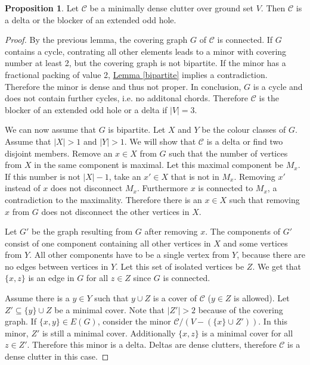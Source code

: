 \documentclass[a4paper, 12pt, twoside=false]{scrbook}
\theoremstyle{definition}
\newtheorem{proposition}[theorem]{Proposition}
\begin{document}
   \begin{proposition}\label{twomember}
       Let $\mathcal{C}$ be a minimally dense clutter over ground set $V$.
       Then $\mathcal{C}$ is a delta or the blocker of an extended odd hole.
   \end{proposition}

   \begin{proof}
       By the previous lemma, the covering graph $G$ of $\mathcal{C}$ is connected.
       If $G$ contains a cycle, contrating all other elements leads to a minor with covering number at least 2, but the covering graph is not bipartite.
       If the minor has a fractional packing of value 2, \hyperref[bipartite]{Lemma \ref*{bipartite}} implies a contradiction. Therefore the minor is dense and thus not proper.
       In conclusion, $G$ is a cycle and does not contain further cycles, i.e. no additonal chords.
       Therefore $\mathcal{C}$ is the blocker of an extended odd hole or a delta if $|V|=3$.

       We can now assume that $G$ is bipartite.
       Let $X$ and $Y$ be the colour classes of $G$.
       Assume that $|X|>1$ and $|Y|>1$.
       We will show that $\mathcal{C}$ is a delta or find two disjoint members.
       Remove an $x \in X$ from $G$ such that the number of vertices from $X$ in the same component is maximal.
       Let this maximal component be $M_x$.
       If this number is not $|X|-1$, take an $x' \in X$ that is not in $M_x$.
       Removing $x'$ instead of $x$ does not disconnect $M_x$. Furthermore $x$ is connected to $M_x$, a contradiction to the maximality.
       Therefore there is an $x \in X$ such that removing $x$ from $G$ does not disconnect the other vertices in $X$.

       Let $G'$ be the graph resulting from $G$ after removing $x$.
       The components of $G'$ consist of one component containing all other vertices in $X$ and some vertices from $Y$.
       All other components have to be a single vertex from $Y$, because there are no edges between vertices in $Y$.
       Let this set of isolated vertices be $Z$.
       We get that $\{x,z\}$ is an edge in $G$ for all $z \in Z$ since $G$ is connected.

       Assume there is a $y \in Y$ such that $y \cup Z$ is a cover of $\mathcal{C}$ ($y \in Z$ is allowed).
       Let $Z' \subseteq \{y\} \cup Z$ be a minimal cover.
       Note that $|Z'| > 2$ because of the covering graph.
       If $\{x,y\} \in E(G)$, consider the minor $\mathcal{C} /(V - (\{x\} \cup Z'))$.
       In this minor, $Z'$ is still a minimal cover.
       Additionally $\{x,z\}$ is a minimal cover for all $z \in Z'$.
       Therefore this minor is a delta.
       Deltas are dense clutters, therefore $\mathcal{C}$ is a dense clutter in this case.


\end{proof}
\end{document}
